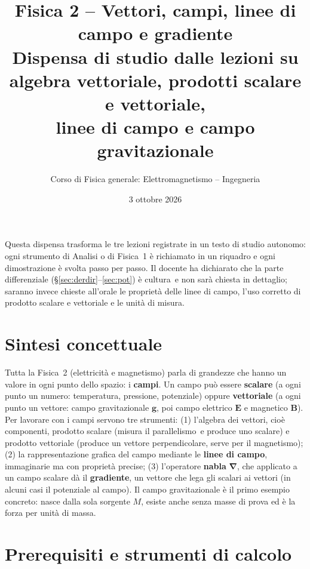 \documentclass[11pt,a4paper]{article}
\title{\textbf{Fisica 2 -- Vettori, campi, linee di campo e gradiente}\\[0.4em]\large Dispensa di studio dalle lezioni su algebra vettoriale, prodotti scalare e vettoriale,\\ linee di campo e campo gravitazionale}
\author{Corso di Fisica generale: Elettromagnetismo -- Ingegneria}
\date{3 ottobre 2026}
\newcommand{\vv}[1]{\mathbf{#1}}
\newcommand{\nab}{\boldsymbol{\nabla}}
\begin{document}
\maketitle
\tableofcontents
\bigskip

Questa dispensa trasforma le tre lezioni registrate in un testo di studio autonomo: ogni strumento di Analisi o di Fisica~1 è richiamato in un riquadro e ogni dimostrazione è svolta passo per passo. Il docente ha dichiarato che la parte differenziale (\S\ref{sec:derdir}--\ref{sec:pot}) è \guillemotleft cultura\guillemotright\ e non sarà chiesta in dettaglio; saranno invece chieste all'orale le proprietà delle linee di campo, l'uso corretto di prodotto scalare e vettoriale e le unità di misura.

\section{Sintesi concettuale}
Tutta la Fisica~2 (elettricità e magnetismo) parla di grandezze che hanno un valore in ogni punto dello spazio: i \textbf{campi}. Un campo può essere \textbf{scalare} (a ogni punto un numero: temperatura, pressione, potenziale) oppure \textbf{vettoriale} (a ogni punto un vettore: campo gravitazionale $\vv g$, poi campo elettrico $\vv E$ e magnetico $\vv B$). Per lavorare con i campi servono tre strumenti: (1) l'algebra dei vettori, cioè componenti, prodotto scalare (misura il \guillemotleft parallelismo\guillemotright\ e produce uno scalare) e prodotto vettoriale (produce un vettore perpendicolare, serve per il magnetismo); (2) la rappresentazione grafica del campo mediante le \textbf{linee di campo}, immaginarie ma con proprietà precise; (3) l'operatore \textbf{nabla} $\nab$, che applicato a un campo scalare dà il \textbf{gradiente}, un vettore che lega gli scalari ai vettori (in alcuni casi il potenziale al campo). Il campo gravitazionale è il primo esempio concreto: nasce dalla sola sorgente $M$, esiste anche senza masse di prova ed è la forza per unità di massa.

\section{Prerequisiti e strumenti di calcolo}
\end{document}

